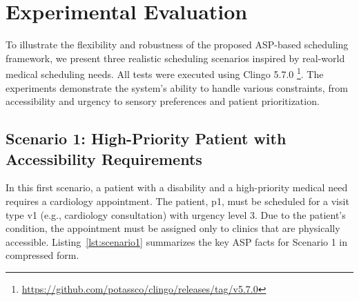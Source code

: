 \documentclass{tlp}
\begin{document}





\vspace{-0.5cm}
\section{Experimental Evaluation}
\label{experiments}

To illustrate the flexibility and robustness of the proposed ASP-based scheduling framework, we present three realistic scheduling scenarios inspired by real-world medical scheduling needs. All tests were executed using Clingo 5.7.0 \footnote{\url{https://github.com/potassco/clingo/releases/tag/v5.7.0}}. The experiments demonstrate the system's ability to handle various constraints, from accessibility and urgency to sensory preferences and patient prioritization.

\subsection{Scenario 1: High-Priority Patient with Accessibility Requirements}
In this first scenario, a patient with a disability and a high-priority medical need requires a cardiology appointment. The patient, p1, must be scheduled for a visit type v1 (e.g., cardiology consultation) with urgency level 3. Due to the patient's condition, the appointment must be assigned only to clinics that are physically accessible. Listing~\ref{lst:scenario1} summarizes the key ASP facts for Scenario 1 in compressed form.
\end{document}
